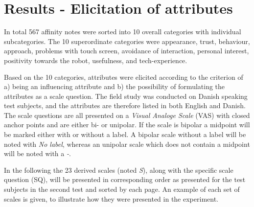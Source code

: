 \section{Results - Elicitation of attributes}
\label{ResultsElicitation}
%
In total 567 affinity notes were sorted into 10 overall categories with individual subcategories. The 10 superordinate categories were appearance, trust, behaviour, approach, problems with touch screen, avoidance of interaction, personal interest, positivity towards the robot, usefulness, and tech-experience.

Based on the 10 categories, attributes were elicited according to the criterion of a) being an influencing attribute and b) the possibility of formulating the attributes as a scale question. The field study was conducted on Danish speaking test subjects, and the attributes are therefore listed in both English and Danish. The scale questions are all presented on a \textit{Visual Analoge Scale} (VAS) with closed anchor points and are either bi- or unipolar. If the scale is bipolar a midpoint will be marked either with or without a label. A bipolar scale without a label will be noted with \textit{No label}, whereas an unipolar scale which does not contain a midpoint will be noted with a \textit{-}. 

In the following the 23 derived scales (noted \textit{S}), along with the specific scale question (SQ), will be presented in corresponding order as presented for the test subjects in the second test and sorted by each page. An example of each set of scales is given, to illustrate how they were presented in the experiment.
